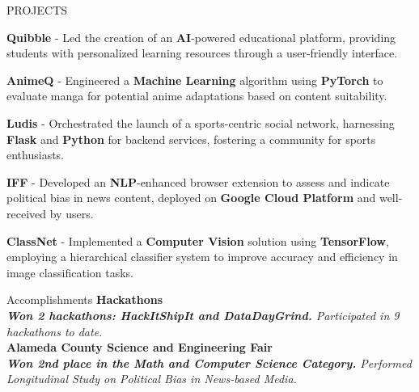 \documentclass{resume} %
\begin{document}
\begin{rSection}{PROJECTS}
\vspace{-1em}


            \item \textbf{Quibble} - Led the creation of an \textbf{AI}-powered educational platform, providing students with personalized learning resources through a user-friendly interface.
        
\vspace{-1.75mm}


            \item \textbf{AnimeQ} - Engineered a \textbf{Machine Learning} algorithm using \textbf{PyTorch} to evaluate manga for potential anime adaptations based on content suitability.
        
\vspace{-1.75mm}


            \item \textbf{Ludis} - Orchestrated the launch of a sports-centric social network, harnessing \textbf{Flask} and \textbf{Python} for backend services, fostering a community for sports enthusiasts.
        
\vspace{-1.75mm}


            \item \textbf{IFF} - Developed an \textbf{NLP}-enhanced browser extension to assess and indicate political bias in news content, deployed on \textbf{Google Cloud Platform} and well-received by users.
        
\vspace{-1.75mm}


            \item \textbf{ClassNet} - Implemented a \textbf{Computer Vision} solution using \textbf{TensorFlow}, employing a hierarchical classifier system to improve accuracy and efficiency in image classification tasks.
        
\end{rSection} 


\begin{rSection}{Accomplishments} 
\textbf{Hackathons}\\
\textit{\textbf{Won 2 hackathons: HackItShipIt and DataDayGrind.} Participated in 9 hackathons to date. } \\
\textbf{Alameda County Science and Engineering Fair}\\
\textit{\textbf{Won 2nd place in the Math and Computer Science Category.} Performed Longitudinal Study on Political Bias in News-based Media.}

\end{rSection}
\end{document}
